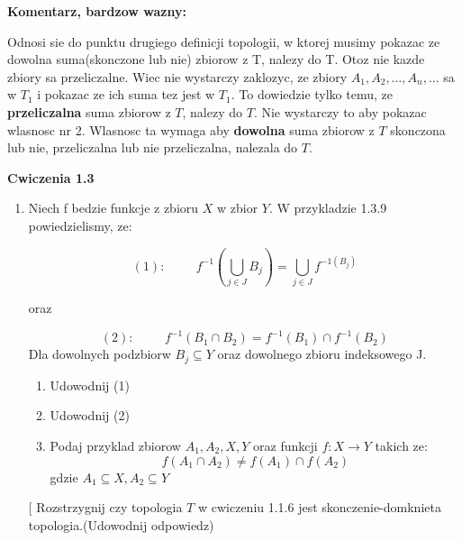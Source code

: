 \documentclass{article}
\makeatletter
\def\myitem{%
   \@ifnextchar[ \@myitem{\@noitemargtrue\@myitem[\@itemlabel]}}
\def\@myitem[#1]{\item[#1]\mbox{}\\}
\makeatother
\begin{document}
\textbf{Komentarz, bardzow wazny:}

Odnosi sie do punktu drugiego definicji topologii, w ktorej musimy pokazac ze dowolna suma(skonczone lub nie) zbiorow z T, nalezy do T. Otoz nie kazde zbiory sa przeliczalne. Wiec nie wystarczy zaklozyc, ze zbiory $A_{1}, A_{2}, \dots, A_{n}, \dots$ sa w $T_{1}$ i pokazac ze ich suma tez jest w $T_{1}$. To dowiedzie tylko temu, ze \textbf{przeliczalna} suma zbiorow z $T$, nalezy do $T$. Nie wystarczy to aby pokazac wlasnosc nr 2. Wlasnosc ta wymaga aby \textbf{dowolna} suma zbiorow z $T$ skonczona lub nie, przeliczalna lub nie przeliczalna, nalezala do $T$. 

\hrulefill

\textbf{Cwiczenia 1.3}



\begin{enumerate}[align=left] %
        \renewcommand{\labelenumi}{\textbf{Cwiczenie 1.3.\arabic{enumi}}}
    \item \hfill \newline Niech f bedzie funkcje z zbioru $X$ w zbior $Y$. W przykladzie 1.3.9 powiedzielismy, ze:

        $$(1): \hspace{1cm} f^{-1}(\bigcup\limits_{j \in J}B_{j}) = \bigcup\limits_{j \in J}f^{-1(B_{j})} $$

        oraz

        $$(2): \hspace{1cm} f^{-1}(B_{1} \cap B_{2}) = f^{-1}(B_{1})\cap f^{-1}(B_{2})$$
        Dla dowolnych podzbiorw $B_{j} \subseteq Y$ oraz dowolnego zbioru indeksowego J.
        \begin{enumerate}[label=(\alph*)]
            \item Udowodnij (1)
            \item Udowodnij (2)
            \item Podaj przyklad zbiorow $A_{1}, A_{2}, X, Y$ oraz funkcji $f: X \rightarrow Y$ takich ze:
                $$f(A_{1} \cap A_{2}) \neq f(A_{1}) \cap f(A_{2})$$
                gdzie $A_{1} \subseteq X, A_{2} \subseteq Y$
        \end{enumerate}

        \myitem Rozstrzygnij czy topologia $T$ w cwiczeniu 1.1.6 jest skonczenie-domknieta topologia.(Udowodnij odpowiedz)


\end{enumerate}
\end{document}

